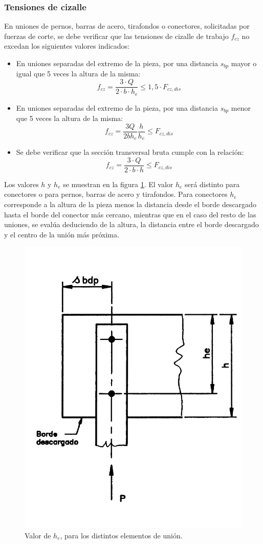 \subsubsection{Tensiones de cizalle}
En uniones de pernos, barras de acero, tirafondos o conectores, solicitadas por fuerzas de corte, se debe verificar que las tensiones de cizalle de trabajo $f_{cz}$ no excedan los siguientes valores indicados:
\begin{itemize}
	\item En uniones separadas del extremo de la pieza, por una distancia $s_{bp}$ mayor o igual que 5 veces la altura de la misma: 
	\begin{equation}
		f_{cz} = \frac{3\cdot Q}{2\cdot b\cdot h_e} \leq 1,5\cdot F_{cz,dis}  
	\end{equation}
	\item En uniones separadas del extremo de la pieza, por una distancia $s_{bp}$ menor que 5 veces la altura de la misma:
	\begin{equation}
		f_{cz} = \frac{3Q}{2 b h_e} \frac{h}{h_e} \leq F_{cz,dis}
	\end{equation}
	\item Se debe verificar que la sección transversal bruta cumple con la relación:
	\begin{equation}
		f_{cz} = \frac{3\cdot Q}{2\cdot b\cdot h} \leq F_{cz,dis}
	\end{equation}		
\end{itemize}

Los valores $h$ y $h_e$ se muestran en la figura \ref{fig:nch_19}. El valor $h_e$ será distinto para conectores o para pernos, barras de acero y tirafondos. Para conectores $h_e$ corresponde a la altura de la pieza menos la distancia desde el borde descargado hasta el borde del conector más cercano, mientras que en el caso del resto de las uniones, se evalúa deduciendo de la altura, la distancia entre el borde descargado y el centro de la unión más próxima.

\begin{figure}[H]
\centering
\includegraphics[width=0.45\linewidth]{Imagenes/figura_19.pdf}
\caption{Valor de $h_e$, para los distintos elementos de unión. \cite{nch1198}}
\label{fig:nch_19}
\end{figure}


